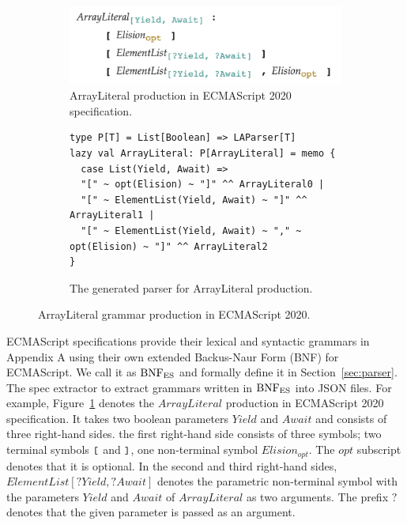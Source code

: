 \begin{figure}
  \centering
  \begin{subfigure}[t]{0.4\textwidth}
    \includegraphics[width=\textwidth]{img/array_literal.png}
    \caption{ArrayLiteral production in ECMAScript 2020 specification.}
    \label{fig:array-literal-es}
  \end{subfigure}
  \begin{subfigure}[t]{0.48\textwidth}
    \begin{lstlisting}[style=myScalastyle]
type P[T] = List[Boolean] => LAParser[T]
lazy val ArrayLiteral: P[ArrayLiteral] = memo {
  case List(Yield, Await) =>
  "[" ~ opt(Elision) ~ "]" ^^ ArrayLiteral0 |
  "[" ~ ElementList(Yield, Await) ~ "]" ^^ ArrayLiteral1 |
  "[" ~ ElementList(Yield, Await) ~ "," ~ opt(Elision) ~ "]" ^^ ArrayLiteral2
}
    \end{lstlisting}
    \caption{The generated parser for ArrayLiteral production.}
    \label{fig:array-literal-parser}
  \end{subfigure}
  \caption{ArrayLiteral grammar production in ECMAScript 2020.}
  \label{fig:array-literal}
\end{figure}

ECMAScript specifications provide their lexical and syntactic grammars in Appendix A
using their own extended Backus-Naur Form (BNF) for ECMAScript.
We call it as \( \text{BNF}_{\text{ES}} \) and formally define it in Section~\ref{sec:parser}.
The spec extractor to extract grammars written in \( \text{BNF}_{\text{ES}} \) into JSON files.
For example, Figure~\ref{fig:array-literal-es} denotes the \( ArrayLiteral \) production
in ECMAScript 2020 specification. It takes two boolean parameters
\( Yield \) and \( Await \) and consists of three right-hand sides.
the first right-hand side consists of three symbols; two terminal symbols \( \texttt{\small[} \) and
\( \texttt{\small]} \), one non-terminal symbol \( Elision_{opt} \). The \( opt \)
subscript denotes that it is optional. In the second and third right-hand sides,
\( ElementList[?Yield, ?Await] \) denotes the parametric non-terminal symbol
with the parameters \( Yield \) and \( Await \) of \( ArrayLiteral \) as two arguments.
The prefix \( ? \) denotes that the given parameter is passed as an argument.

